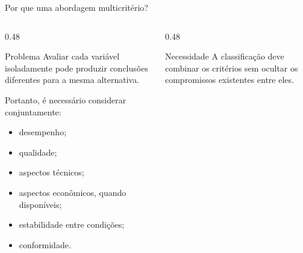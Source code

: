 
\begin{frame}{Por que uma abordagem multicritério?}

    \begin{columns}[T]


        \begin{column}{0.48\textwidth}

            \begin{block}{Problema}
                Avaliar cada variável isoladamente pode produzir
                conclusões diferentes para a mesma alternativa.
            \end{block}

            \vspace{0.2cm}

            Portanto, é necessário considerar conjuntamente:

            \begin{itemize}
                \item desempenho;
                \item qualidade;
                \item aspectos técnicos;
                \item aspectos econômicos, quando disponíveis;
                \item estabilidade entre condições;
                \item conformidade.
            \end{itemize}

        \end{column}



        \begin{column}{0.48\textwidth}

            \begin{block}{Necessidade}
                A classificação deve combinar os critérios sem ocultar
                os compromissos existentes entre eles.
            \end{block}


\end{column}
\end{columns}
\end{frame}
